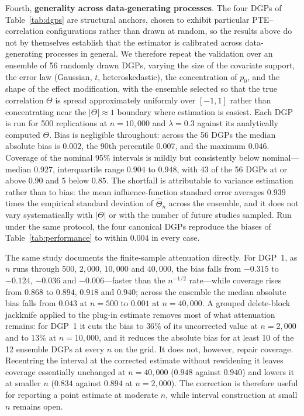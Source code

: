 \documentclass{article}
\begin{document}
Fourth, \textbf{generality across data-generating processes}. The four DGPs of
Table~\ref{tab:dgps} are structural anchors, chosen to exhibit particular
PTE--correlation configurations rather than drawn at random, so the results above
do not by themselves establish that the estimator is calibrated across
data-generating processes in general. We therefore repeat the validation over an
ensemble of 56 randomly drawn DGPs, varying the size of the covariate support, the
error law (Gaussian, $t$, heteroskedastic), the concentration of $p_0$, and the
shape of the effect modification, with the ensemble selected so that the true
correlation $\Theta$ is spread approximately uniformly over $[-1,1]$ rather than
concentrating near the $|\Theta| \approx 1$ boundary where estimation is easiest.
Each DGP is run for 500 replications at $n = 10{,}000$ and $\lambda = 0.3$ against
its analytically computed $\Theta$. Bias is negligible throughout: across the 56
DGPs the median absolute bias is $0.002$, the 90th percentile $0.007$, and the
maximum $0.046$. Coverage of the nominal 95\% intervals is mildly but consistently
below nominal---median $0.927$, interquartile range $0.904$ to $0.948$, with 43 of
the 56 DGPs at or above $0.90$ and 5 below $0.85$. The shortfall is attributable to
variance estimation rather than to bias: the mean influence-function standard error
averages $0.939$ times the empirical standard deviation of $\hat{\Theta}_n$ across
the ensemble, and it does not vary systematically with $|\Theta|$ or with the
number of future studies sampled. Run under the same protocol, the four canonical
DGPs reproduce the biases of Table~\ref{tab:performance} to within $0.004$ in every
case.

The same study documents the finite-sample attenuation directly. For DGP~1, as $n$
runs through $500$, $2{,}000$, $10{,}000$ and $40{,}000$, the bias falls from
$-0.315$ to $-0.124$, $-0.036$ and $-0.006$---faster than the $n^{-1/2}$
rate---while coverage rises from $0.868$ to $0.894$, $0.918$ and $0.940$; across
the ensemble the median absolute bias falls from $0.043$ at $n = 500$ to $0.001$ at
$n = 40{,}000$. A
grouped delete-block jackknife applied to the plug-in estimate removes most of what
attenuation remains: for DGP~1 it cuts the bias to $36\%$ of its uncorrected value
at $n = 2{,}000$ and to $13\%$ at $n = 10{,}000$, and it reduces the absolute bias
for at least 10 of the 12 ensemble DGPs at every $n$ on the grid. It does not,
however, repair coverage. Recentring the interval at the corrected estimate without
rewidening it leaves coverage essentially unchanged at $n = 40{,}000$ ($0.948$
against $0.940$) and lowers it at smaller $n$ ($0.834$ against $0.894$ at
$n = 2{,}000$). The correction is therefore useful for reporting a point estimate
at moderate $n$, while interval construction at small $n$ remains open.
\end{document}
